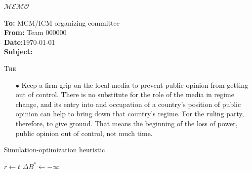 \documentclass[12pt]{article}  %
\begin{document}
\begin{letter}{\huge{$\mathscr{MEMO}$}}
\begin{flushleft}  %
\textbf{To:} MCM/ICM organizing committee\\
\textbf{From:} Team 000000\\
\textbf{Date:}\today\\
\textbf{Subject:} 
\end{flushleft}
\lettrine{T}{he}
{\itshape \begin{enumerate}[0]
    \item[$\bullet$] Keep a firm grip on the local media to prevent public opinion from getting out of control. There is no substitute for the role of the media in regime change, and its entry into and occupation of a country's position of public opinion can help to bring down that country's regime. For the ruling party, therefore, to give ground. That means the beginning of the loss of power, public opinion out of control, not much time.
\end{enumerate}}
\end{letter}
\begin{algorithm}
\caption{Simulation-optimization heuristic}\label{algorithm}
$r\leftarrow t$\;
$\Delta B^{\ast}\leftarrow -\infty$\;
\end{algorithm}








\end{document}
